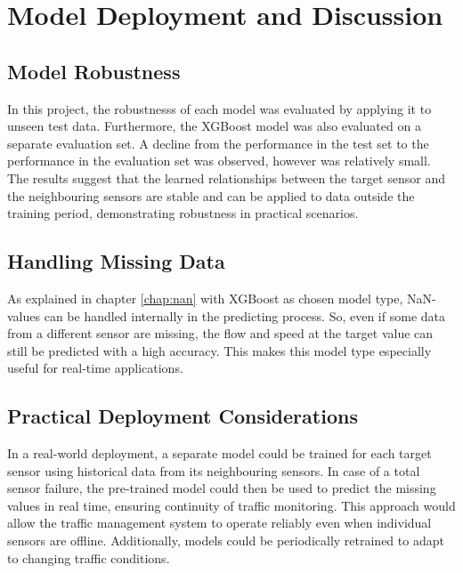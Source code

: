	\section{Model Deployment and Discussion}
	\subsection{Model Robustness }
	In this project, the robustnesss of each model was evaluated by applying it to unseen test data.  Furthermore, the XGBoost model was also evaluated on a separate evaluation set.
	A decline from the performance in the test set to the performance in the evaluation set was observed, however was relatively small.  The results suggest that the learned relationships between the target sensor and the neighbouring sensors are stable and can be applied to data outside the training period, demonstrating robustness in practical scenarios.
	\subsection{Handling Missing  Data}
	As explained in chapter \ref{chap:nan} with XGBoost as chosen model type, NaN-values can be handled internally in the predicting process. So, even if some data from a different sensor are missing, the flow and speed at the target value can still be predicted with a high accuracy. This makes this model type especially useful for real-time applications.
	\subsection{Practical Deployment Considerations}
	In a real-world deployment, a separate model could be trained for each target sensor using historical data from its neighbouring sensors. In case of a total sensor failure, the pre-trained model could then be used to predict the missing values in real time, ensuring continuity of traffic monitoring. This approach would allow the traffic management system to operate reliably even when individual sensors are offline. Additionally, models could be periodically retrained to adapt to changing traffic conditions.
